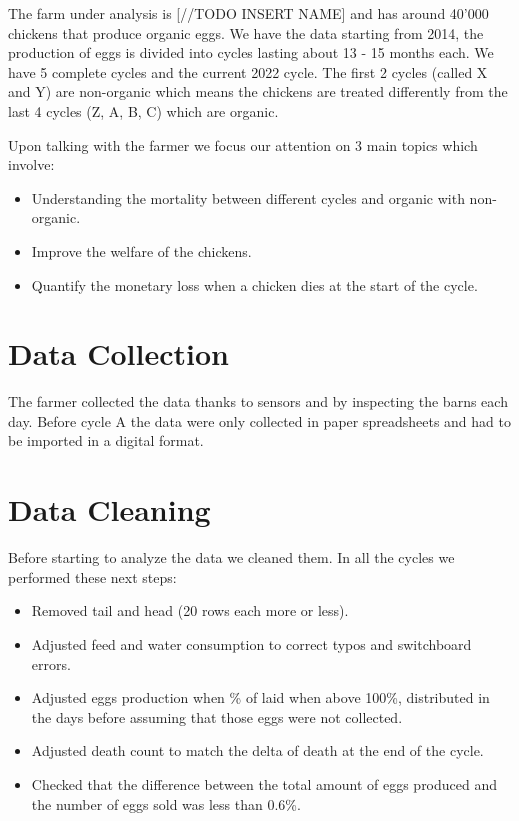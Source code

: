 \documentclass[11pt]{article}
\begin{document}
The farm under analysis is [//TODO INSERT NAME] and has around 40'000 chickens that produce organic eggs. We have the data starting from 2014, the production of eggs is divided into cycles lasting about 13 - 15 months each. We have 5 complete cycles and the current 2022 cycle. The first 2 cycles (called X and Y) are non-organic which means the chickens are treated differently from the last 4 cycles (Z, A, B, C) which are organic.

Upon talking with the farmer we focus our attention on 3 main topics which involve:
\begin{itemize}
    \item Understanding the mortality between different cycles and organic with non-organic.
    \item Improve the welfare of the chickens.
    \item Quantify the monetary loss when a chicken dies at the start of the cycle.
\end{itemize}

\section{Data Collection}
The farmer collected the data thanks to sensors and by inspecting the barns each day. Before cycle A the data were only collected in paper spreadsheets and had to be imported in a digital format.

\section{Data Cleaning}
Before starting to analyze the data we cleaned them.
In all the cycles we performed these next steps:
\begin{itemize}
    \item Removed tail and head (20 rows each more or less).
    \item Adjusted feed and water consumption to correct typos and switchboard errors.
    \item Adjusted eggs production when \% of laid when above 100\%, distributed in the days before assuming that those eggs were not collected.
    \item Adjusted death count to match the delta of death at the end of the cycle.
    \item Checked that the difference between the total amount of eggs produced and the number of eggs sold was less than 0.6\%.
\end{itemize}
\end{document}
